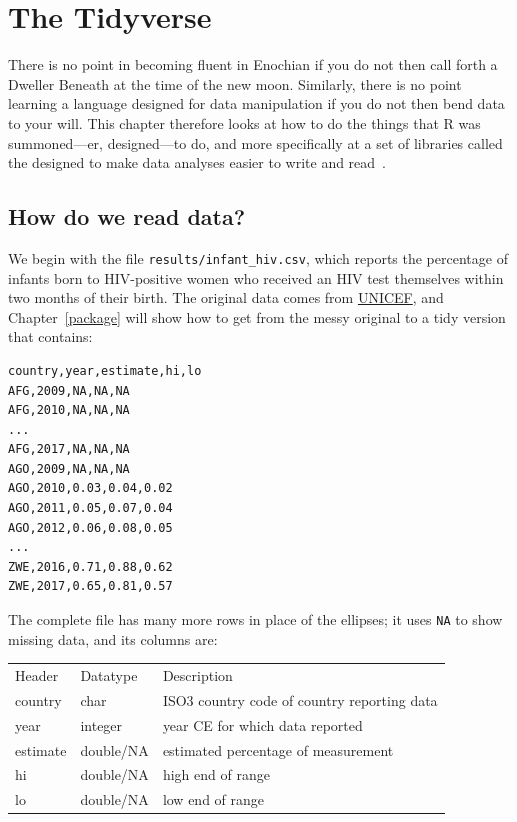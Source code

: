 \chapter{The Tidyverse}\label{tidyverse}

There is no point in becoming fluent in Enochian if you do not then call forth a Dweller Beneath at the time of the new moon.
Similarly,
there is no point learning a language designed for data manipulation if you do not then bend data to your will.
This chapter therefore looks at how to do the things that R was summoned---er, designed---to do,
and more specifically at a set of libraries called the 
designed to make data analyses easier to write and read~\cite{Wick2017}.

\section{How do we read data?}

We begin with the file \texttt{results/infant\_hiv.csv},
which reports the percentage of infants born to HIV-positive women
who received an HIV test themselves within two months of their birth.
The original data comes from \href{https://data.unicef.org/resources/dataset/hiv-aids-statistical-tables/}{UNICEF},
and Chapter~\ref{package} will show how to get from the messy original to a tidy version that contains:

\begin{lstlisting}
country,year,estimate,hi,lo
AFG,2009,NA,NA,NA
AFG,2010,NA,NA,NA
...
AFG,2017,NA,NA,NA
AGO,2009,NA,NA,NA
AGO,2010,0.03,0.04,0.02
AGO,2011,0.05,0.07,0.04
AGO,2012,0.06,0.08,0.05
...
ZWE,2016,0.71,0.88,0.62
ZWE,2017,0.65,0.81,0.57
\end{lstlisting}

The complete file has many more rows in place of the ellipses;
it uses \texttt{NA} to show missing data,
and its columns are:

\begin{longtable}[]{@{}lll@{}}
Header & Datatype & Description\\
country & char & ISO3 country code of country reporting data\\
year & integer & year CE for which data reported\\
estimate & double/NA & estimated percentage of measurement\\
hi & double/NA & high end of range\\
lo & double/NA & low end of range\\
\end{longtable}

